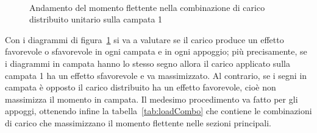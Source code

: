 \begin{figure}
	\centering
	\\
	\caption{Andamento del momento flettente nella combinazione di carico distribuito unitario sulla campata 1}
	\label{fig:bendingMoment_loadSpan_1}
\end{figure}

Con i diagrammi di figura~\ref{fig:bendingMoment_loadSpan_1} si va a valutare se il carico produce un effetto favorevole o sfavorevole in ogni campata e in ogni appoggio; più precisamente, se i diagrammi in campata hanno lo stesso segno allora il carico applicato sulla campata 1 ha un effetto sfavorevole e va massimizzato. Al contrario, se i segni in campata è opposto il carico distribuito ha un effetto favorevole, cioè non massimizza il momento in campata. Il medesimo procedimento va fatto per gli appoggi, ottenendo infine la tabella~\ref{tab:loadCombo} che contiene le combinazioni di carico che massimizzano il momento flettente nelle sezioni principali. 


